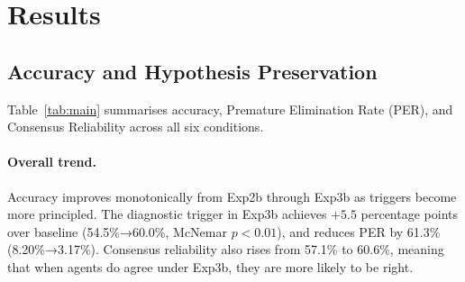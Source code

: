 \section{Results}
\label{sec:results}

\subsection{Accuracy and Hypothesis Preservation}

Table~\ref{tab:main} summarises accuracy, Premature Elimination Rate (PER),
and Consensus Reliability across all six conditions.

\begin{table}[t]
\centering
\caption{Main results on 200 MMLU-Pro questions.
$\Delta\text{Acc}$ is absolute improvement over baseline.
PER = premature elimination rate (lower is better).
CR = consensus reliability.
Best result per column in \textbf{bold}.
Significance vs.\ baseline (McNemar): $^{*}p\!<\!0.05$, $^{**}p\!<\!0.01$.}
\label{tab:main}
\end{table}

\paragraph{Overall trend.}
Accuracy improves monotonically from Exp2b through Exp3b as triggers become
more principled.
The diagnostic trigger in Exp3b achieves $+5.5$ percentage points over
baseline (54.5\%→60.0\%, McNemar $p\!<\!0.01$), and reduces PER by
61.3\% (8.20\%→3.17\%).
Consensus reliability also rises from 57.1\% to 60.6\%, meaning that when
agents do agree under Exp3b, they are more likely to be right.

